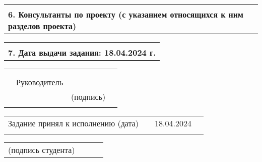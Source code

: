 \documentclass[12pt, А4, twoside]{article} %
\begin{document}
\begin{FlushLeft}
    \begin{tabular}{p{17.25cm}} 
        \vspace{1pt} \hline  \\
        \textsf{\textbf{6. Консультанты по проекту (с указанием относящихся к ним разделов проекта)}} \vspace{1pt} \hline \\
    \end{tabular}   

    \begin{tabular}{p{17.25cm}} 
        \vspace{1pt} \hline  \\
        \textsf{\textbf{7. Дата выдачи задания: 18.04.2024 г.}} \vspace{1pt} \hline \\
    \end{tabular} 

    \begin{tabular}{p{4.2cm} p{3.8cm} p{6.0cm} p{2.0cm}} 
        & & & 
        \\ 
        & & & 
        \\
        & \fontsize{14}{17.5} \textrm{Руководитель} & 
        \vspace{1pt} \hline & 
        \\ 
        & & \centering \fontsize{12}{15} \textsf{(подпись)} & 
        \\ 
        & & &
    \end{tabular} 

\fontsize{12}{15}

    \begin{tabular}{p{7.5cm} p{0.5cm} p{6.0cm} p{2.0cm}} %
        \textsf{Задание принял к исполнению (дата)} & &
        \centering \textsf{18.04.2024} \vspace{1pt} \hline & 
        \\ %
        & & & %
    \end{tabular} %

    \begin{tabular}{p{4.0cm} p{0.2cm} p{9.8cm} p{2.0cm}} %
        \textsf{(подпись студента)} & &
        \vspace{1pt} \hline & 
        \\ %
    \end{tabular} %

\end{FlushLeft} %
\end{document}
